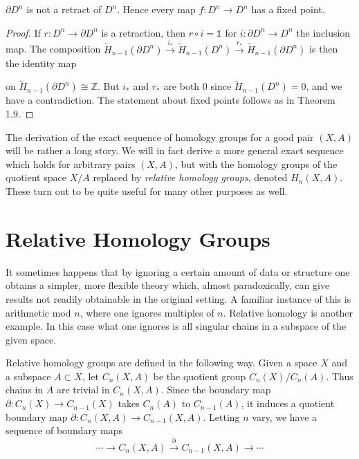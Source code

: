 \begin{corollary}
\label{cor:non-retraction-disk-boundary}
$\partial D^n$ is not a retract of $D^n$. Hence every map $f:D^n \to D^n$ has a
fixed point.
\end{corollary}
\begin{proof}
 If $r:D^n \to \partial D^n$ is a retraction, then $r \circ i = \mathbb{1}$ for $i:\partial D^n \to D^n$ the inclusion map.
The composition $\tilde H_{n-1}(\partial D^n) \xrightarrow{i_*} \tilde H_{n-1}(D^n) \xrightarrow{r_*} \tilde H_{n-1}(\partial D^n)$ is then the identity map

on $\tilde H_{n-1}(\partial D^n) \cong \mathbb{Z}$. But $i_*$ and $r_*$ are both 0 since $\tilde H_{n-1}(D^n) = 0$, and we have a
contradiction. The statement about fixed points follows as in Theorem 1.9.
\end{proof}
The derivation of the exact sequence of homology groups for a good pair $(X,A)$
will be rather a long story. We will in fact derive a more general exact sequence which
holds for arbitrary pairs $(X,A)$, but with the homology groups of the quotient space
$X/A$ replaced by \textit{relative homology groups}, denoted $H_n(X,A)$. These turn out to be
quite useful for many other purposes as well.

\section*{Relative Homology Groups}

It sometimes happens that by ignoring a certain amount of data or structure one
obtains a simpler, more flexible theory which, almost paradoxically, can give results
not readily obtainable in the original setting. A familiar instance of this is arithmetic
mod $n$, where one ignores multiples of $n$. Relative homology is another example. In
this case what one ignores is all singular chains in a subspace of the given space.

Relative homology groups are defined in the following way. Given a space $X$ and
a subspace $A \subset X$, let $C_n(X,A)$ be the quotient group $C_n(X)/C_n(A)$. Thus chains in
$A$ are trivial in $C_n(X,A)$. Since the boundary map $\partial:C_n(X) \to C_{n-1}(X)$ takes $C_n(A)$
to $C_{n-1}(A)$, it induces a quotient boundary map $\partial:C_n(X,A) \to C_{n-1}(X,A)$. Letting $n$
vary, we have a sequence of boundary maps
$$\cdots \to C_n(X,A) \xrightarrow{\partial} C_{n-1}(X,A) \to \cdots$$


